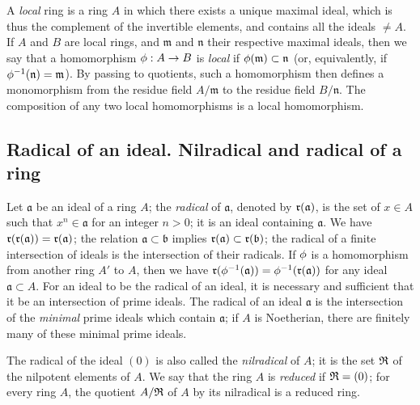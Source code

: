 \begin{env}[1.0.7]
\label{0.1.0.7}
A \emph{local} ring is a ring $A$ in which there exists a unique maximal ideal, which is thus the complement of the invertible elements, and contains all the ideals $\neq A$.
If $A$ and $B$ are local rings, and $\mathfrak{m}$ and $\mathfrak{n}$ their respective maximal ideals, then we say that a homomorphism $\vphi:A\to B$ is \emph{local} if $\phi(\mathfrak{m})\subset\mathfrak{n}$ (or, equivalently, if $\phi^{-1}(\mathfrak{n})=\mathfrak{m}$).
By passing to quotients, such a homomorphism then defines a monomorphism from the residue field $A/\mathfrak{m}$ to the residue field $B/\mathfrak{n}$.
The composition of any two local homomorphisms is a local homomorphism.
\end{env}

\subsection{Radical of an ideal. Nilradical and radical of a ring}
\label{subsection:0.1.1}

\begin{env}[1.1.1]
\label{0.1.1.1}
Let $\mathfrak{a}$ be an ideal of a ring $A$;
the \emph{radical} of $\mathfrak{a}$, denoted by $\mathfrak{r}(\mathfrak{a})$, is the set of $x\in A$ such that $x^n\in\mathfrak{a}$ for an integer $n>0$;
it is an ideal containing $\mathfrak{a}$.
We have $\mathfrak{r}(\mathfrak{r}(\mathfrak{a}))=\mathfrak{r}(\mathfrak{a})$;
the relation $\mathfrak{a}\subset\mathfrak{b}$ implies $\mathfrak{r}(\mathfrak{a})\subset\mathfrak{r}(\mathfrak{b})$;
the radical of a finite intersection of ideals is the intersection of their radicals.
If $\phi$ is a homomorphism from another ring $A'$ to $A$, then we have $\mathfrak{r}(\phi^{-1}(\mathfrak{a}))=\phi^{-1}(\mathfrak{r}(\mathfrak{a}))$ for any ideal $\mathfrak{a}\subset A$.
For an ideal to be the radical of an ideal, it is necessary and sufficient that it be an intersection of prime ideals.
The radical of an ideal $\mathfrak{a}$ is the intersection of the \emph{minimal} prime ideals which contain $\mathfrak{a}$;
if $A$ is Noetherian, there are finitely many of these minimal prime ideals.

The radical of the ideal $(0)$ is also called the \emph{nilradical} of $A$;
it is the set $\mathfrak{R}$ of the nilpotent elements of $A$.
We say that the ring $A$ is \emph{reduced} if $\mathfrak{R}=(0)$;
for every ring $A$, the quotient $A/\mathfrak{R}$ of $A$ by its nilradical is a reduced ring.
\end{env}

